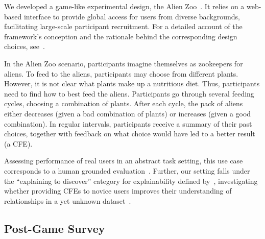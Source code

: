 We developed a game-like experimental design, the Alien Zoo~\citep{IAZ ARXIV}.
It relies on a web-based interface to provide global access for users from diverse backgrounds, facilitating large-scale participant recruitment.
For a detailed account of the framework's conception and the rationale behind the corresponding design choices, see~\citet{IAZ ARXIV}.

In the Alien Zoo scenario, participants imagine themselves as zookeepers for aliens. 
To feed to the aliens, participants may choose from different plants. 
However, it is not clear what plants make up a nutritious diet. 
Thus, participants need to find how to best feed the aliens. 
Participants go through several feeding cycles, choosing a combination of plants. 
After each cycle, the pack of aliens either decreases (given a bad combination of plants) or increases (given a good combination). 
In regular intervals, participants receive a summary of their past choices, together with feedback on what choice would have led to a better result (\ie a \gls{CFE}).


Assessing performance of real users in an abstract task setting, this use case corresponds to a human grounded evaluation~\citep{doshi-velez_towards_2017}.
Further, our setting falls under the ``explaining to discover'' category for explainability defined by~\citeauthor{adadi_peeking_2018}, investigating whether providing \glspl{CFE} to novice users improves their understanding of relationships in a yet unknown dataset~\citep{adadi_peeking_2018}.


\subsection{Post-Game Survey}

